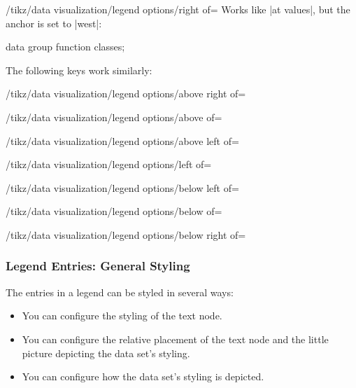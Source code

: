 \begin{key}{/tikz/data visualization/legend options/right of=}
    Works like |at values|, but the anchor is set to |west|:
\begin{codeexample}[width=6cm]
\tikz \datavisualization [
  scientific axes,
  visualize as smooth line/.list={log, lin},
  legend={right of={x=-1, y=2}},
  log=    {label in legend={text=$\log x$}},
  lin=    {label in legend={text=$x/2$}},
  style sheet=strong colors]
data group {function classes};
\end{codeexample}
\end{key}

The following keys work similarly:
%
\begin{key}{/tikz/data visualization/legend options/above right of=}
\end{key}
%
\begin{key}{/tikz/data visualization/legend options/above of=}
\end{key}
%
\begin{key}{/tikz/data visualization/legend options/above left of=}
\end{key}
%
\begin{key}{/tikz/data visualization/legend options/left of=}
\end{key}
%
\begin{key}{/tikz/data visualization/legend options/below left of=}
\end{key}
%
\begin{key}{/tikz/data visualization/legend options/below of=}
\end{key}
%
\begin{key}{/tikz/data visualization/legend options/below right of=}
\end{key}


\subsubsection{Legend Entries: General Styling}
\label{section-dv-label-legend-entry-options}

The entries in a legend can be styled in several ways:
%
\begin{itemize}
    \item You can configure the styling of the text node.
    \item You can configure the relative placement of the text node and the
        little picture depicting the data set's styling.
    \item You can configure how the data set's styling is depicted.
\end{itemize}

